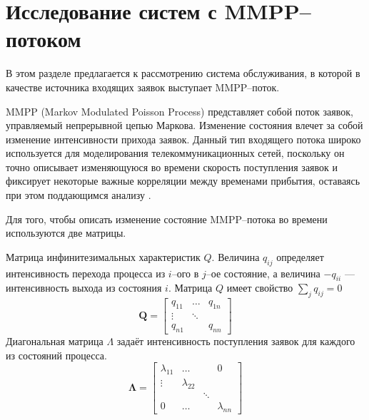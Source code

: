 \section {\centering Исследование систем с MMPP--потоком} \label{mmpp_section}
В этом разделе предлагается к рассмотрению система обслуживания, в которой в качестве источника входящих заявок выступает MMPP--поток.

MMPP (Markov Modulated Poisson Process) представляет собой поток заявок, управляемый непрерывной цепью Маркова. Изменение состояния влечет за собой изменение интенсивности прихода заявок. Данный тип входящего потока широко используется для моделирования телекоммуникационных сетей, поскольку он точно описывает изменяющуюся во времени скорость поступления заявок и фиксирует некоторые важные корреляции между временами прибытия, оставаясь при этом поддающимся анализу \cite{fischer1993markov}.
 
Для того, чтобы описать изменение состояние MMPP--потока во времени используются две матрицы.

Матрица инфинитезимальных характеристик $Q$. Величина $q_{ij}$ определяет интенсивность перехода процесса из $i$--ого в $j$--ое состояние, а величина $-q_{ii}$ --- интенсивность выхода из состояния $i$.
Матрица $Q$ имеет свойство $\sum_{j}q_{ij} = 0$
\begin{equation*}
	\boldsymbol{Q}=\begin{bmatrix}
		q_{11} &  \dots &  q_{1n}\\
		\vdots & \ddots &  \\
		q_{n1} &    	&	q_{nn}
	\end{bmatrix}
\end{equation*}
Диагональная матрица $\Lambda$ задаёт интенсивность поступления заявок для каждого из состояний процесса.
\begin{equation*}
	\boldsymbol{\Lambda}=\begin{bmatrix}
		\lambda_{11}&	\dots	&   	 & 0\\
		\vdots 		&\lambda_{22}&  	 &   \\
		       		&    		& \ddots &   \\
		0  			&   \dots 	&		 & \lambda_{nn}
	\end{bmatrix}
\end{equation*}

